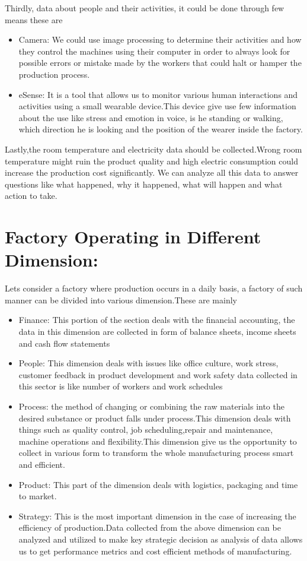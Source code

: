 \documentclass{article}
\begin{document}
\begin{normalsize}
      Thirdly, data about people and their activities, it could be done through few means these are 
       	\begin{itemize}
        
\item{Camera: We could use image processing to determine their activities and how they control the machines using their computer in order to always look for possible errors or mistake made by the workers that could halt or hamper the production process. }
\item{eSense: It is a tool that allows us to monitor various human interactions and activities using a small wearable device.This device give use few information about the use like stress and emotion in voice, is he standing or walking, which direction he is looking and the position of the wearer inside the factory.
} 

	


	\end{itemize}
	Lastly,the room temperature and electricity data should be collected.Wrong room temperature might ruin the product quality and 
high electric consumption could increase the production cost significantly.
	We can analyze all this data to answer questions like what happened, why it happened, what will happen and what action to take.
	\section{Factory Operating in Different Dimension:}
	Lets consider a factory where production occurs in a daily basis, a factory of such manner can be divided into various dimension.These are mainly
	 	\begin{itemize}
        
\item{Finance: This portion of the section deals with the financial accounting, the data in this dimension are collected in form of balance sheets, income sheets and cash flow statements }
\item{People: This dimension deals with issues like office culture, work stress, customer feedback in product development and  work safety data collected in this sector is like number of workers and work schedules} 
\item{Process: the method of changing or combining the raw materials into the desired substance or product falls under process.This dimension deals with things such as quality control, job scheduling,repair and maintenance, machine operations and flexibility.This dimension give us the opportunity to collect in various form to transform the whole manufacturing process smart and efficient.}
\item{Product: This part of the dimension deals with logistics, packaging and time to market.
}
\item{Strategy: This is the most important dimension in the case of increasing the efficiency of production.Data collected from the above dimension can be analyzed and utilized  to make key strategic decision as analysis of data allows us to get performance metrics  and cost efficient methods of manufacturing.
 
}
\end{itemize}
\end{normalsize}
\end{document}
